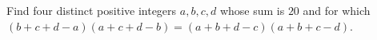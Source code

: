 Find four distinct positive integers $a,b,c,d$ whose sum is $20$ and for which $(b+c+d-a)(a+c+d-b)=(a+b+d-c)(a+b+c-d)$.
